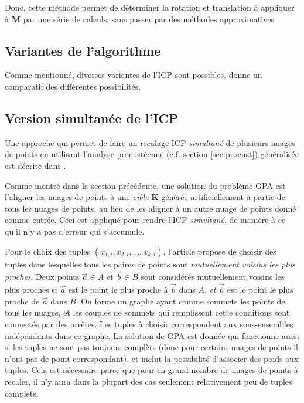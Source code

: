 \documentclass[a4paper,10pt]{scrreprt}
\begin{document}
Donc, cette méthode permet de déterminer la rotation et translation à appliquer à \textbf{M} par une série de calculs, sans passer par des méthodes approximatives.


\subsection{Variantes de l'algorithme}
Comme mentionné, diverses variantes de l'ICP sont possibles. \cite{Rusi2001} donne un comparatif des différentes possibilités.

\subsection{Version simultanée de l'ICP}
Une approche qui permet de faire un recalage ICP \emph{simultané} de plusieurs nuages de points en utilisant l'analyse procustéenne (c.f. section \ref{sec:procust}) généralisée est décrite dans \cite{Told2010}.

Comme montré dans la section précédente, une solution du problème GPA est l'aligner les nuages de points à une \emph{cible} $\mathbf{K}$ générée artificiellement à partie de tous les nuages de points, au lieu de les aligner à un autre nuage de points donné comme entrée. Ceci est appliqué pour rendre l'ICP \emph{simultané}, de manière à ce qu'il n'y a pas d'erreur qui s'accumule.

Pour le choix des tuples ${(x_{1,i}, x_{2,i}, \ldots, x_{k,i})}$, l'article propose de choisir des tuples dans lesquelles tous les paires de points sont \emph{mutuellement voisins les plus proches}. Deux points $\vec{a} \in A$ et $\vec{b} \in B$ sont considérés mutuellement voisins les plus proches si $\vec{a}$ est le point le plus proche à $\vec{b}$ dans $A$, \emph{et} $\vec{b}$ est le point le plus proche de $\vec{a}$ dans $B$. On forme un graphe ayant comme sommets les points de tous les nuages, et les couples de sommets qui remplissent cette conditions sont connectés par des arrêtes. Les tuples à choisir correspondent aux sous-ensembles indépendants dans ce graphe. La solution de GPA est donnée qui fonctionne aussi si les tuples ne sont pas toujours complèts (donc pour certains nuages de points il n'ont pas de point correspondant), et inclut la possibilité d'associer des poids aux tuples. Cela est nécessaire parce que pour en grand nombre de nuages de points à recaler, il n'y aura dans la plupart des cas seulement relativement peu de tuples complets.
\end{document}
